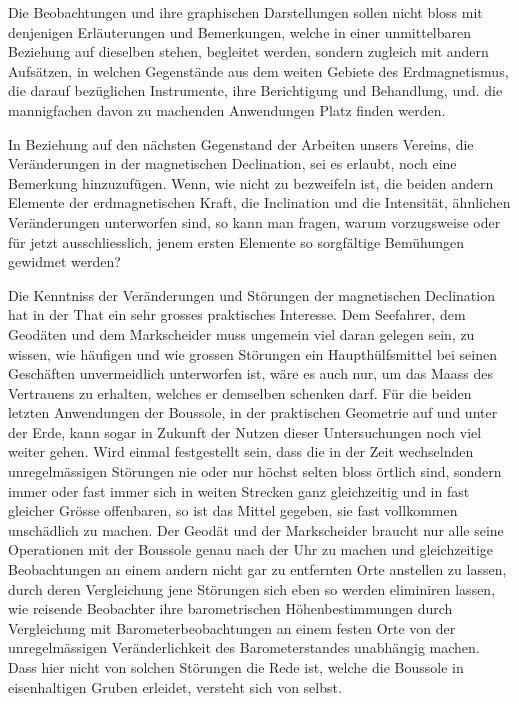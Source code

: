 Die Beobachtungen und ihre graphischen Darstellungen sollen nicht bloss mit denjenigen Erläuterungen und Bemerkungen, welche in einer unmittelbaren Beziehung auf dieselben stehen, begleitet werden, sondern zugleich mit andern Aufsätzen, in welchen Gegenstände aus dem weiten Gebiete des Erdmagnetismus, die darauf bezüglichen Instrumente, ihre Berichtigung und Behandlung, und. die mannigfachen davon zu machenden Anwendungen Platz finden werden.

\par\clearpage
{}
In Beziehung auf den nächsten Gegenstand der Arbeiten unsers Vereins, die Veränderungen in der magnetischen Declination, sei es erlaubt, noch eine Bemerkung hinzuzufügen. Wenn, wie nicht zu bezweifeln ist, die beiden andern Elemente der erdmagnetischen Kraft, die Inclination und die Intensität, ähnlichen Veränderungen unterworfen sind, so kann man fragen, warum vorzugsweise oder für jetzt ausschliesslich, jenem ersten Elemente so sorgfältige Bemühungen gewidmet werden?

Die Kenntniss der Veränderungen und Störungen der magnetischen Declination hat in der That ein sehr grosses praktisches Interesse. Dem Seefahrer, dem Geodäten und dem Markscheider muss ungemein viel daran gelegen sein, zu wissen, wie häufigen und wie grossen Störungen ein Haupthülfsmittel bei seinen Geschäften unvermeidlich unterworfen ist, wäre es auch nur, um das Maass des Vertrauens zu erhalten, welches er demselben schenken darf. Für die beiden letzten Anwendungen der Boussole, in der praktischen Geometrie auf und unter der Erde, kann sogar in Zukunft der Nutzen dieser Untersuchungen noch viel weiter gehen. Wird einmal festgestellt sein, dass die in der Zeit wechselnden unregelmässigen Störungen nie oder nur höchst selten bloss örtlich sind, sondern immer oder fast immer sich in weiten Strecken ganz gleichzeitig und in fast gleicher Grösse offenbaren, so ist das Mittel gegeben, sie fast vollkommen unschädlich zu machen. Der Geodät und der Markscheider braucht nur alle seine Operationen mit der Boussole genau nach der Uhr zu machen und gleichzeitige Beobachtungen an einem andern nicht gar zu entfernten Orte anstellen zu lassen, durch deren Vergleichung jene Störungen sich eben so werden eliminiren lassen, wie reisende Beobachter ihre barometrischen Höhenbestimmungen durch Vergleichung mit Barometerbeobachtungen an einem festen Orte von der unregelmässigen Veränderlichkeit des Barometerstandes unabhängig machen. Dass hier nicht von solchen Störungen die Rede ist, welche die Boussole in eisenhaltigen Gruben erleidet, versteht sich von selbst.

